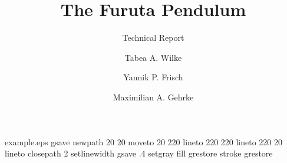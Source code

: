 %
%
%
%
%
\begin{filecontents*}{example.eps}
gsave
newpath
  20 20 moveto
  20 220 lineto
  220 220 lineto
  220 20 lineto
closepath
2 setlinewidth
gsave
  .4 setgray fill
grestore
stroke
grestore
\end{filecontents*}
%
\RequirePackage{fix-cm}
%
\documentclass[smallextended, natbib]{svjour3}       %
%
\smartqed  %
%
\usepackage{graphicx}
\usepackage{tikz}

%
 \usepackage{mathptmx}      %
%
\usepackage{amsmath}
\usepackage{gensymb}
%
%
%


\title{The Furuta Pendulum
}
\subtitle{Technical Report}


\author{Tabea A. Wilke \and Yannik P. Frisch \and Maximilian A. Gehrke }



